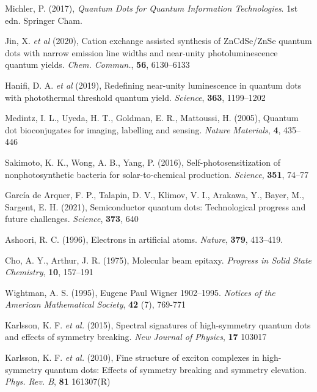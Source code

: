 \documentclass[12pt]{article}
\begin{document}
\begin{thebibliography}{10}

Michler, P. (2017), \textit{Quantum Dots for Quantum Information Technologies}. 1st edn. Springer Cham.

Jin, X. \textit{et al} (2020), Cation exchange assisted synthesis of ZnCdSe/ZnSe quantum dots with narrow emission line widths and near-unity photoluminescence quantum yields. \textit{Chem. Commun.}, \textbf{56}, 6130--6133

Hanifi, D. A. \textit{et al} (2019), Redefining near-unity luminescence in quantum dots with photothermal threshold quantum yield. \textit{Science}, \textbf{363}, 1199--1202

Medintz, I. L., Uyeda, H. T., Goldman, E. R., Mattoussi, H. (2005),
Quantum dot bioconjugates for imaging, labelling and sensing. \textit{Nature Materials}, \textbf{4}, 435--446

Sakimoto, K. K., Wong, A. B., Yang, P. (2016), Self-photosensitization
of nonphotosynthetic bacteria for solar-to-chemical production. \textit{Science}, \textbf{351}, 74--77

García de Arquer, F. P., Talapin, D. V., Klimov, V. I., Arakawa, Y., Bayer, M., Sargent, E. H. (2021), Semiconductor quantum dots: Technological progress and future challenges. \textit{Science}, \textbf{373}, 640 

Ashoori, R. C. (1996), Electrons in artificial atoms. \textit{Nature}, \textbf{379}, 413--419.

Cho, A. Y., Arthur, J. R. (1975), Molecular beam epitaxy. \textit{Progress in Solid State Chemistry}, \textbf{10}, 157--191

Wightman, A. S. (1995), Eugene Paul Wigner 1902--1995. \textit{Notices of the American Mathematical Society}, \textbf{42} (7), 769-771

Karlsson, K. F. \textit{et al.} (2015), Spectral signatures of high-symmetry quantum dots and effects of symmetry breaking. \textit{New Journal of Physics}, \textbf{17} 103017

Karlsson, K. F. \textit{et al.} (2010), Fine structure of exciton complexes in high-symmetry quantum dots: Effects of symmetry breaking and symmetry elevation. \textit{Phys. Rev. B}, \textbf{81} 161307(R)


\end{thebibliography}
\end{document}
